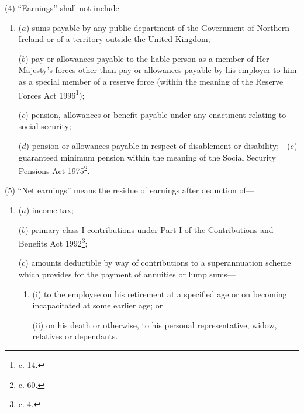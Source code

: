 \documentclass[12pt,a4paper]{article}
\begin{document}
(4) “Earnings” shall not include—
\begin{enumerate}\item[]
($a$) sums payable by any public department of the Government of Northern Ireland or of a territory outside the United Kingdom;

($b$) pay or allowances payable to the liable person as a member of Her Majesty’s forces
other than pay or allowances payable by his employer to him as a special member of a reserve force (within the meaning of the Reserve Forces Act 1996\footnote{ c. 14.});  %

($c$) pension, allowances or benefit payable under any enactment relating to social security;

($d$) pension or allowances payable in respect of disablement or disability;
-
($e$) guaranteed minimum pension within the meaning of the Social Security Pensions Act 1975\footnote{ c. 60.}.
\end{enumerate}

(5) “Net earnings” means the residue of earnings after deduction of—
\begin{enumerate}\item[]
($a$) income tax;

($b$) primary class I contributions under Part I of the Contributions and Benefits Act 1992\footnote{ c. 4.};

($c$) amounts deductible by way of contributions to a superannuation scheme which provides for the payment of annuities or 
lump %
sums—
\begin{enumerate}\item[]
(i) to the employee on his retirement at a specified age or on becoming incapacitated at some earlier age; or

(ii) on his death or otherwise, to his personal representative, widow, relatives or dependants.
\end{enumerate}
\end{enumerate}

\end{document}
